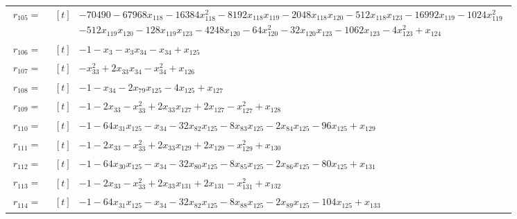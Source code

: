 \begin{longtable}{@{}r p{0.92\linewidth}@{}}
$r_{105}=$ & $\begin{aligned}[t]&-70490-67968x_{118}-16384x_{118}^{2}-8192x_{118}x_{119}-2048x_{118}x_{120}-512x_{118}x_{123}-16992x_{119}-1024x_{119}^{2}\\[-1pt] &-512x_{119}x_{120}-128x_{119}x_{123}-4248x_{120}-64x_{120}^{2}-32x_{120}x_{123}-1062x_{123}-4x_{123}^{2}+x_{124}\end{aligned}$ \\[2pt]
$r_{106}=$ & $\begin{aligned}[t]&-1-x_{3}-x_{3}x_{34}-x_{34}+x_{125}\end{aligned}$ \\[2pt]
$r_{107}=$ & $\begin{aligned}[t]&-x_{33}^{2}+2x_{33}x_{34}-x_{34}^{2}+x_{126}\end{aligned}$ \\[2pt]
$r_{108}=$ & $\begin{aligned}[t]&-1-x_{34}-2x_{79}x_{125}-4x_{125}+x_{127}\end{aligned}$ \\[2pt]
$r_{109}=$ & $\begin{aligned}[t]&-1-2x_{33}-x_{33}^{2}+2x_{33}x_{127}+2x_{127}-x_{127}^{2}+x_{128}\end{aligned}$ \\[2pt]
$r_{110}=$ & $\begin{aligned}[t]&-1-64x_{31}x_{125}-x_{34}-32x_{82}x_{125}-8x_{83}x_{125}-2x_{84}x_{125}-96x_{125}+x_{129}\end{aligned}$ \\[2pt]
$r_{111}=$ & $\begin{aligned}[t]&-1-2x_{33}-x_{33}^{2}+2x_{33}x_{129}+2x_{129}-x_{129}^{2}+x_{130}\end{aligned}$ \\[2pt]
$r_{112}=$ & $\begin{aligned}[t]&-1-64x_{30}x_{125}-x_{34}-32x_{80}x_{125}-8x_{85}x_{125}-2x_{86}x_{125}-80x_{125}+x_{131}\end{aligned}$ \\[2pt]
$r_{113}=$ & $\begin{aligned}[t]&-1-2x_{33}-x_{33}^{2}+2x_{33}x_{131}+2x_{131}-x_{131}^{2}+x_{132}\end{aligned}$ \\[2pt]
$r_{114}=$ & $\begin{aligned}[t]&-1-64x_{31}x_{125}-x_{34}-32x_{82}x_{125}-8x_{88}x_{125}-2x_{89}x_{125}-104x_{125}+x_{133}\end{aligned}$ \\[2pt]

\end{longtable}
